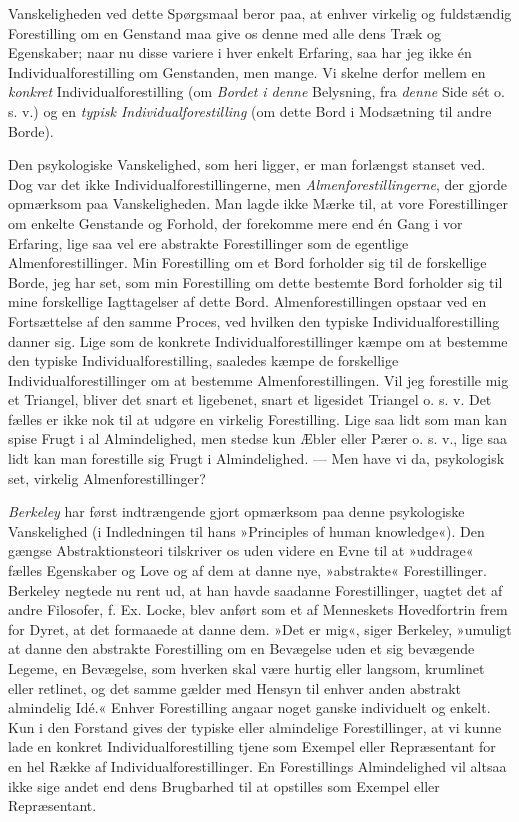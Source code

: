 \documentclass[12pt,a4paper,openany]{book}
\newcommand{\opage}[1]{\marginnote{\footnotesize\textit{[#1]}}}
\begin{document}
Vanskeligheden ved dette Spørgsmaal beror paa, at enhver virkelig og
fuldstændig Forestilling om en Genstand maa give os denne med alle dens
Træk og Egenskaber; naar nu disse variere i hver enkelt Erfaring, saa
har jeg ikke én Individualforestilling om Genstanden, men mange. Vi
skelne derfor mellem en \emph{konkret} Individualforestilling (om
\emph{Bordet i denne} Belysning, fra \emph{denne} Side sét o. s. v.) og
en \emph{typisk Individualforestilling} (om dette Bord i Modsætning til
andre Borde).

Den psykologiske Vanskelighed, som heri ligger, er man forlængst stanset
ved. Dog var det ikke Individualforestillingerne, men
\emph{Almenforestillingerne}, der gjorde opmærksom paa Vanskeligheden.
Man lagde ikke Mærke til, at vore Forestillinger om enkelte Genstande og
Forhold, der forekomme mere end én Gang i vor Erfaring, lige saa vel ere
abstrakte Forestillinger som de egentlige Almenforestillinger. Min
Forestilling om et Bord forholder sig til de forskellige Borde, jeg har
set, som min Forestilling om dette bestemte Bord forholder sig til mine
forskellige Iagttagelser af dette Bord. Almenforestillingen opstaar ved
en Fortsættelse af den samme Proces, ved hvilken den typiske
Individualforestilling danner sig. Lige som de konkrete
Individualforestillinger kæmpe om at bestemme den typiske
Individualforestilling, saaledes kæmpe de forskellige
Individualforestillinger om at bestemme Almenforestillingen. Vil jeg
forestille mig et Triangel, bliver det snart et ligebenet, snart et
ligesidet Triangel o. s. v. Det fælles er ikke nok til at udgøre en
virkelig Forestilling. Lige saa lidt som man kan spise Frugt i al
Almindelighed, men stedse kun Æbler eller Pærer o. s. v., lige saa lidt
kan man forestille sig Frugt i Almindelighed. --- Men have vi da,
psykologisk set, virkelig Almenforestillinger?


\opage{202}\emph{Berkeley} har først indtrængende gjort opmærksom paa
denne psykologiske Vanskelighed (i Indledningen til hans »Principles of
human knowledge«). Den gængse Abstraktionsteori tilskriver os uden
videre en Evne til at »uddrage« fælles Egenskaber og Love og af dem at
danne nye, »abstrakte« Forestillinger. Berkeley negtede nu rent ud, at
han havde saadanne Forestillinger, uagtet det af andre Filosofer, f. Ex.
Locke, blev anført som et af Menneskets Hovedfortrin frem for Dyret, at
det formaaede at danne dem. »Det er mig«, siger Berkeley, »umuligt at
danne den abstrakte Forestilling om en Bevægelse uden et sig bevægende
Legeme, en Bevægelse, som hverken skal være hurtig eller langsom,
krumlinet eller retlinet, og det samme gælder med Hensyn til enhver
anden abstrakt almindelig Idé.« Enhver Forestilling angaar noget ganske
individuelt og enkelt. Kun i den Forstand gives der typiske eller
almindelige Forestillinger, at vi kunne lade en konkret
Individualforestilling tjene som Exempel eller Repræsentant for en hel
Række af Individualforestillinger. En Forestillings Almindelighed vil
altsaa ikke sige andet end dens Brugbarhed til at opstilles som Exempel
eller Repræsentant.
\end{document}
